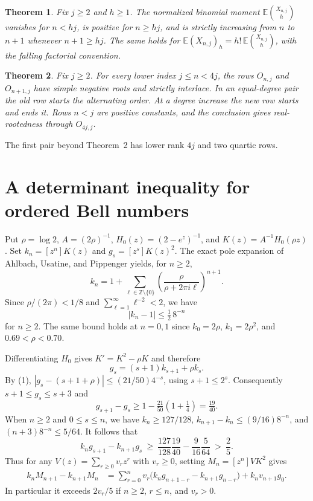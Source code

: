 \documentclass[11pt]{article}
\newtheorem{theorem}{Theorem}
\begin{document}
\begin{theorem}
Fix \(j\ge2\) and \(h\ge1\). The normalized binomial moment \(\mathbb E\binom{X_{n,j}}{h}\) vanishes for \(n<hj\), is positive for \(n\ge hj\), and is strictly increasing from \(n\) to \(n+1\) whenever \(n+1\ge hj\). The same holds for \(\mathbb E(X_{n,j})_h=h!\,\mathbb E\binom{X_{n,j}}h\), with the falling factorial convention.
\end{theorem}

\begin{theorem}
Fix \(j\ge2\). For every lower index \(j\le n<4j\), the rows \(O_{n,j}\) and \(O_{n+1,j}\) have simple negative roots and strictly interlace. In an equal-degree pair the old row starts the alternating order. At a degree increase the new row starts and ends it. Rows \(n<j\) are positive constants, and the conclusion gives real-rootedness through \(O_{4j,j}\).
\end{theorem}

The first pair beyond Theorem~2 has lower rank \(4j\) and two quartic rows.

\section{A determinant inequality for ordered Bell numbers}

Put \(\rho=\log2\), \(A=(2\rho)^{-1}\), \(H_0(z)=(2-e^z)^{-1}\), and \(K(z)=A^{-1}H_0(\rho z)\). Set \(k_n=[z^n]K(z)\) and \(g_s=[z^s]K(z)^2\). The exact pole expansion of Ahlbach, Usatine, and Pippenger \cite[Theorem~14, Eq.~(6)]{aup} yields, for \(n\ge2\),
\[
k_n=1+\sum_{\ell\in\mathbb Z\setminus\{0\}}
     \left(\frac{\rho}{\rho+2\pi i\ell}\right)^{n+1}.
\]
Since \(\rho/(2\pi)<1/8\) and \(\sum_{\ell=1}^\infty\ell^{-2}<2\), we have
\[
|k_n-1|\le\tfrac12\,8^{-n}
\tag{1}
\]
for \(n\ge2\). The same bound holds at \(n=0,1\) since \(k_0=2\rho\),
\(k_1=2\rho^2\), and \(0.69<\rho<0.70\).

Differentiating \(H_0\) gives \(K'=K^2-\rho K\) and therefore
\[
g_s=(s+1)k_{s+1}+\rho k_s.
\]
By (1), \(|g_s-(s+1+\rho)|\le (21/50)4^{-s}\), using \(s+1\le2^s\). Consequently \(s+1\le g_s\le s+3\) and
\[
g_{s+1}-g_s\ge1-\tfrac{21}{50}(1+\tfrac14)=\tfrac{19}{40}.
\]
When \(n\ge2\) and \(0\le s\le n\), we have \(k_n\ge127/128\), \(k_{n+1}-k_n\le (9/16)8^{-n}\), and \((n+3)8^{-n}\le5/64\). It follows that
\[
k_n g_{s+1}-k_{n+1}g_s
\ \ge\ \frac{127}{128}\frac{19}{40}-\frac9{16}\frac5{64}
\ >\ \frac25 .
\tag{2}
\]
Thus for any \(V(z)=\sum_{r\ge0}v_rz^r\) with \(v_r\ge0\), setting \(M_n=[z^n]VK^2\) gives
\[
\begin{aligned}
k_n M_{n+1}-k_{n+1}M_n
&=\sum_{r=0}^n v_r\bigl(k_n g_{n+1-r}-k_{n+1}g_{n-r}\bigr)
   +k_nv_{n+1}g_0 .
\end{aligned}
\tag{3}
\]
In particular it exceeds \(2v_r/5\) if \(n\ge2\), \(r\le n\), and \(v_r>0\).
\end{document}
